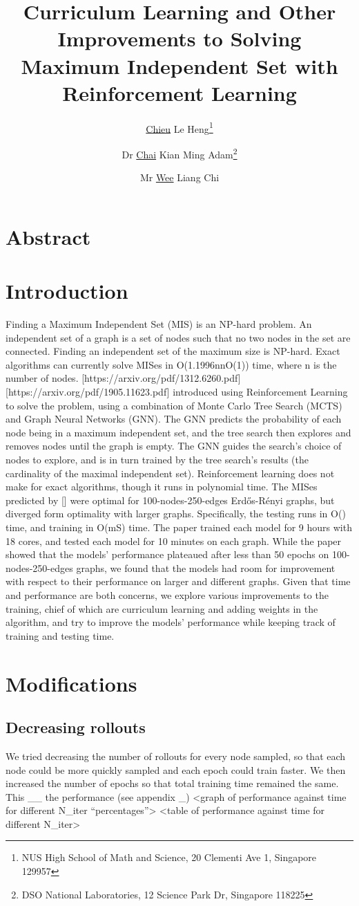 \documentclass{article}
\title{Curriculum Learning and Other Improvements to Solving Maximum Independent Set with Reinforcement Learning}
\author{\underline{Chieu} Le Heng\thanks{NUS High School of Math and Science, 20 Clementi Ave 1, Singapore 129957} \and Dr \underline{Chai} Kian Ming Adam\thanks{DSO National Laboratories, 12 Science Park Dr, Singapore 118225} \and Mr \underline{Wee} Liang Chi\samethanks}
\begin{document}
\maketitle

\section{Abstract}
\section{Introduction}
Finding a Maximum Independent Set (MIS) is an NP-hard problem. An independent set of a graph is a set of nodes such that no two nodes in the set are connected. Finding an independent set of the maximum size is NP-hard.
Exact algorithms can currently solve MISes in O(1.1996nnO(1)) time, where n is the number of nodes. [https://arxiv.org/pdf/1312.6260.pdf]
[https://arxiv.org/pdf/1905.11623.pdf] introduced using Reinforcement Learning to solve the problem, using a combination of Monte Carlo Tree Search (MCTS) and Graph Neural Networks (GNN). The GNN predicts the probability of each node being in a maximum independent set, and the tree search then explores and removes nodes until the graph is empty. The GNN guides the search’s choice of nodes to explore, and is in turn trained by the tree search’s results (the cardinality of the maximal independent set). 
Reinforcement learning does not make for exact algorithms, though it runs in polynomial time. The MISes predicted by [] were optimal for 100-nodes-250-edges Erdős-Rényi graphs, but diverged form optimality with larger graphs. Specifically, the testing runs in O() time, and training in O(mS) time. The paper trained each model for 9 hours with 18 cores, and tested each model for 10 minutes on each graph. 
While the paper showed that the models’ performance plateaued after less than 50 epochs on 100-nodes-250-edges graphs, we found that the models had room for improvement with respect to their performance on larger and different graphs. Given that time and performance are both concerns, we explore various improvements to the training, chief of which are curriculum learning and adding weights in the algorithm, and try to improve the models’ performance while keeping track of training and testing time. 
\section{Modifications}
\subsection{Decreasing rollouts}
We tried decreasing the number of rollouts for every node sampled, so that each node could be more quickly sampled and each epoch could train faster. We then increased the number of epochs so that total training time remained the same. This __ the performance (see appendix _)
<graph of performance against time for different N_iter “percentages”>
<table of performance against time for different N_iter>
\end{document}
